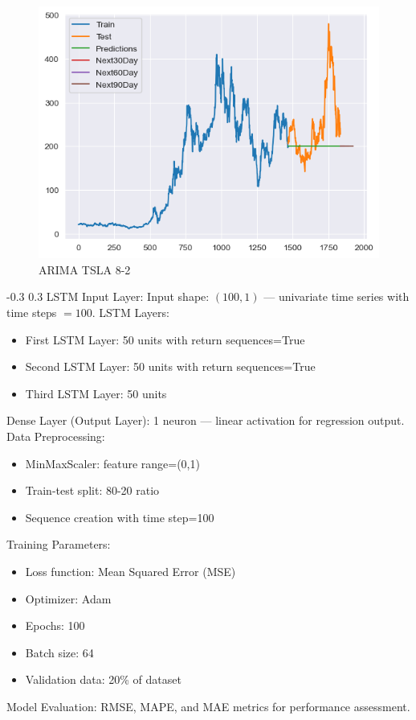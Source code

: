 \documentclass[twocolumn]{llncs}
\makeatletter
\renewcommand{\subsection}{\@startsection{subsection}{2}{\z@}%
  {-0.3\baselineskip}  %
  {0.3\baselineskip}   %
  {\normalfont\normalsize\bfseries}}
\makeatother
\begin{document}
\begin{figure}[H]
    \centering
    \includegraphics[width=1\linewidth]{Arima.png}
    \caption{ARIMA TSLA 8-2 }
    \label{fig:boxplot}
\end{figure}

\subsection{LSTM}
Input Layer: Input shape: $(100, 1)$ — univariate time series with time steps $= 100$.
\noindent LSTM Layers:
\begin{itemize}
\item First LSTM Layer: 50 units with return sequences=True
\item Second LSTM Layer: 50 units with return sequences=True
\item Third LSTM Layer: 50 units
\end{itemize}
\noindent Dense Layer (Output Layer): 1 neuron — linear activation for regression output.
\noindent Data Preprocessing:
\begin{itemize}
\item MinMaxScaler: feature range=(0,1)
\item Train-test split: 80-20 ratio
\item Sequence creation with time step=100
\end{itemize}
\noindent Training Parameters:
\begin{itemize}
\item Loss function: Mean Squared Error (MSE)
\item Optimizer: Adam
\item Epochs: 100
\item Batch size: 64
\item Validation data: 20\% of dataset
\end{itemize}
\noindent Model Evaluation: RMSE, MAPE, and MAE metrics for performance assessment.
\end{document}
